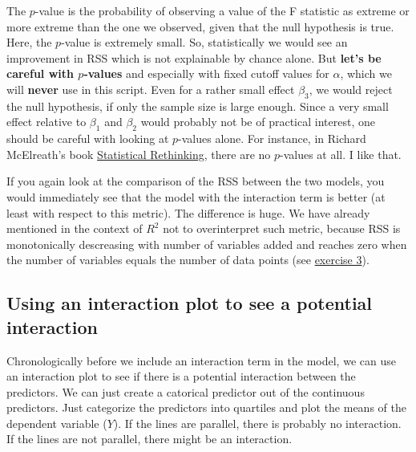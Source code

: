 \documentclass[
]{book}
\begin{document}
The \(p\)-value is the probability of observing a value of the F statistic as extreme or more
extreme than the one we observed, given that the null hypothesis is true. Here,
the \(p\)-value is extremely small. So, statistically we would see an improvement in RSS
which is not explainable by chance alone.
But \textbf{let's be careful with \(p\)-values} and especially with fixed cutoff values for \(\alpha\),
which we will \textbf{never} use in this script.
Even for a rather small effect \(\beta_3\), we would reject the null hypothesis, if only the sample
size is large enough. Since a very small effect relative to \(\beta_1\) and \(\beta_2\) would
probably not be of practical interest, one should be careful with looking at \(p\)-values alone.
For instance, in Richard McElreath's book \href{https://xcelab.net/rm/statistical-rethinking/}{Statistical Rethinking},
there are no \(p\)-values at all. I like that.

If you again look at the comparison of the RSS between the two models, you would
immediately see that the model with the interaction term is better (at least with respect to this metric).
The difference is huge. We have already mentioned in the context of \(R^2\) not to overinterpret
such metric, because RSS is monotonically descreasing with number of variables added and reaches
zero when the number of variables equals the number of data points (see \hyperref[exercise3_multiple_regression]{exercise 3}).

\subsection{Using an interaction plot to see a potential interaction}\label{interaction_plot}

Chronologically before we include an interaction term in the model, we can use an interaction plot
to see if there is a potential interaction between the predictors.
We can just create a catorical predictor out of the continuous predictors.
Just categorize the predictors into quartiles and plot the means of the dependent variable (\(Y\)).
If the lines are parallel, there is probably no interaction. If the lines are not parallel,
there might be an interaction.
\end{document}
